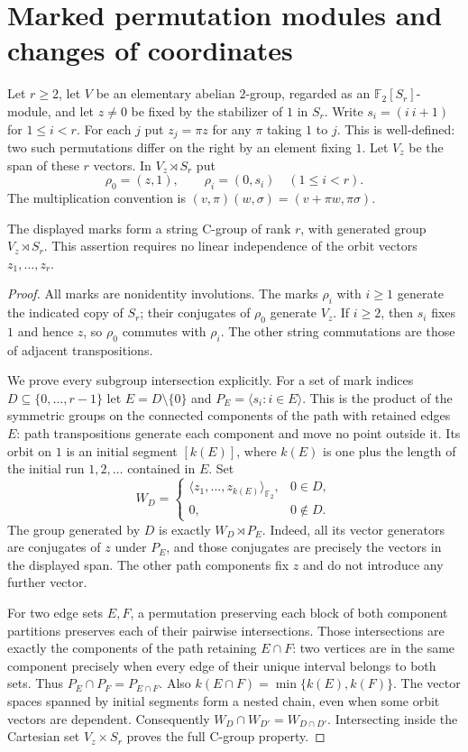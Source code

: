 \section{Marked permutation modules and changes of coordinates}
Let $r\geq2$, let $V$ be an elementary abelian $2$-group, regarded as an
$\mathbb F_2[S_r]$-module, and let $z\ne0$ be fixed by the stabilizer of
$1$ in $S_r$. Write $s_i=(i\ i+1)$ for $1\leq i<r$. For each $j$ put
$z_j=\pi z$ for any $\pi$ taking $1$ to $j$. This is well-defined:
two such permutations differ on the right by an element fixing $1$.
Let $V_z$ be the span of these $r$ vectors. In $V_z\rtimes S_r$ put
\[
 \rho_0=(z,1),\qquad \rho_i=(0,s_i)\quad(1\leq i<r).
\]
The multiplication convention is $(v,\pi)(w,\sigma)=(v+\pi w,\pi\sigma)$.

\begin{theorem}\label{thm:module-marking}
The displayed marks form a string C-group of rank $r$, with generated
group $V_z\rtimes S_r$. This assertion requires no linear independence
of the orbit vectors $z_1,\ldots,z_r$.
\end{theorem}
\begin{proof}
All marks are nonidentity involutions. The marks $\rho_i$ with $i\geq1$
generate the indicated copy of $S_r$; their conjugates of $\rho_0$
generate $V_z$. If $i\geq2$, then $s_i$ fixes $1$ and hence $z$, so
$\rho_0$ commutes with $\rho_i$. The other string commutations are
those of adjacent transpositions.

We prove every subgroup intersection explicitly. For a set of mark
indices $D\subseteq\{0,\ldots,r-1\}$ let $E=D\setminus\{0\}$ and
$P_E=\langle s_i:i\in E\rangle$. This is the product of the symmetric
groups on the connected components of the path with retained edges $E$:
path transpositions generate each component and move no point outside
it. Its orbit on $1$ is an initial segment $[k(E)]$, where $k(E)$ is
one plus the length of the initial run $1,2,\ldots$ contained in $E$.
Set
\[
 W_D=\begin{cases}
 \langle z_1,\ldots,z_{k(E)}\rangle_{\mathbb F_2},&0\in D,\\
 0,&0\notin D.
 \end{cases}
\]
The group generated by $D$ is exactly $W_D\rtimes P_E$. Indeed, all
its vector generators are conjugates of $z$ under $P_E$, and those
conjugates are precisely the vectors in the displayed span. The
other path components fix $z$ and do not introduce any further vector.

For two edge sets $E,F$, a permutation preserving each block of both
component partitions preserves each of their pairwise intersections. Those
intersections are exactly the components of the path retaining
$E\cap F$: two vertices are in the same component precisely when every
edge of their unique interval belongs to both sets. Thus
$P_E\cap P_F=P_{E\cap F}$. Also
$k(E\cap F)=\min\{k(E),k(F)\}$. The vector spaces spanned by initial
segments form a nested chain, even when some orbit vectors are dependent.
Consequently $W_D\cap W_{D'}=W_{D\cap D'}$. Intersecting inside the
Cartesian set $V_z\times S_r$ proves the full C-group property.
\end{proof}

